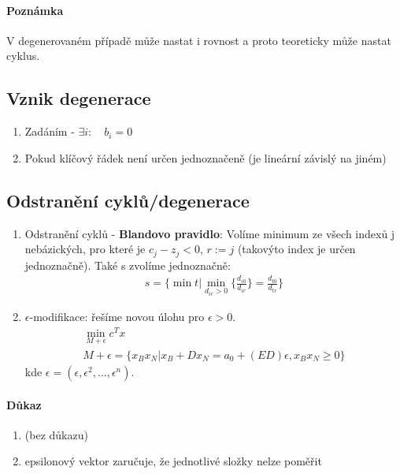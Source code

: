 \documentclass[a4paper,12pt,titlepage]{article}
\begin{document}
\paragraph{Poznámka}
V degenerovaném případě může nastat i rovnost a proto teoreticky může nastat
cyklus.


\subsection{Vznik degenerace}
\setcounter{equation}{0}
\begin{enumerate}
	\item Zadáním - $\exists i : \quad b_i = 0$
	\item Pokud klíčový řádek není určen jednoznačeně (je lineární závislý na
	jiném)
\end{enumerate}


\subsection{Odstranění cyklů/degenerace}
\setcounter{equation}{0}
\begin{enumerate}
	\item Odstranění cyklů - \textbf{Blandovo pravidlo}: Volíme minimum ze všech indexů j
	nebázických, pro které je $c_j - z_j < 0$, $r := j$ (takovýto index je určen
	jednoznačně). Také s zvolíme jednoznačně:
	\begin{align}
		s = \{ \min t | \min_{d_{ir} > 0} \{ \frac{d_{i0}}{d_{ir}} \} =
		\frac{d_{t0}}{d_{tr}} \}
	\end{align}

	\item $\epsilon$-modifikace: řešíme novou úlohu pro $\epsilon > 0$.
	\begin{align}
		\min_{M+\epsilon} c^Tx\\
		M+\epsilon= \{x_Bx_N | x_B + Dx_N = a_0 + (ED) \epsilon, x_Bx_N \ge 0 \}
	\end{align}
	kde $\epsilon = (\epsilon, \epsilon^2, ..., \epsilon^n)$.

\end{enumerate}
\paragraph{Důkaz}
\begin{enumerate}
	\item (bez důkazu)
	\item epsilonový vektor zaručuje, že jednotlivé složky nelze poměřit
\end{enumerate}
\end{document}
